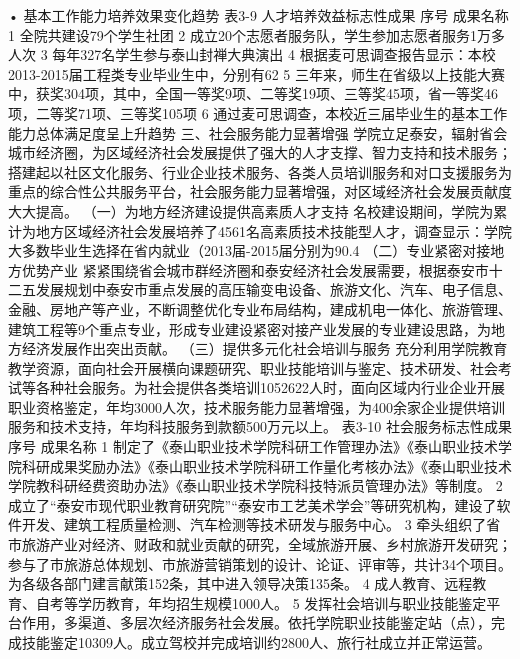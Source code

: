 	•	基本工作能力培养效果变化趋势
表3-9  人才培养效益标志性成果
序号
成果名称
1
全院共建设79个学生社团
2
成立20个志愿者服务队，学生参加志愿者服务1万多人次
3
每年327名学生参与泰山封禅大典演出
4
根据麦可思调查报告显示：本校2013-2015届工程类专业毕业生中，分别有62%
5
三年来，师生在省级以上技能大赛中，获奖304项，其中，全国一等奖9项、二等奖19项、三等奖45项，省一等奖46项，二等奖71项、三等奖105项
6
通过麦可思调查，本校近三届毕业生的基本工作能力总体满足度呈上升趋势
三、社会服务能力显著增强
学院立足泰安，辐射省会城市经济圈，为区域经济社会发展提供了强大的人才支撑、智力支持和技术服务；搭建起以社区文化服务、行业企业技术服务、各类人员培训服务和对口支援服务为重点的综合性公共服务平台，社会服务能力显著增强，对区域经济社会发展贡献度大大提高。
（一）为地方经济建设提供高素质人才支持
名校建设期间，学院为累计为地方区域经济社会发展培养了4561名高素质技术技能型人才，调查显示：学院大多数毕业生选择在省内就业（2013届-2015届分别为90.4%
（二）专业紧密对接地方优势产业
紧紧围绕省会城市群经济圈和泰安经济社会发展需要，根据泰安市十二五发展规划中泰安市重点发展的高压输变电设备、旅游文化、汽车、电子信息、金融、房地产等产业，不断调整优化专业布局结构，建成机电一体化、旅游管理、建筑工程等9个重点专业，形成专业建设紧密对接产业发展的专业建设思路，为地方经济发展作出突出贡献。
（三）提供多元化社会培训与服务
充分利用学院教育教学资源，面向社会开展横向课题研究、职业技能培训与鉴定、技术研发、社会考试等各种社会服务。为社会提供各类培训1052622人时，面向区域内行业企业开展职业资格鉴定，年均3000人次，技术服务能力显著增强，为400余家企业提供培训服务和技术支持，年均科技服务到款额500万元以上。
表3-10  社会服务标志性成果
序号
成果名称
1
制定了《泰山职业技术学院科研工作管理办法》《泰山职业技术学院科研成果奖励办法》《泰山职业技术学院科研工作量化考核办法》《泰山职业技术学院教科研经费资助办法》《泰山职业技术学院科技特派员管理办法》等制度。
2
成立了“泰安市现代职业教育研究院”“泰安市工艺美术学会”等研究机构，建设了软件开发、建筑工程质量检测、汽车检测等技术研发与服务中心。
3
牵头组织了省市旅游产业对经济、财政和就业贡献的研究，全域旅游开展、乡村旅游开发研究；参与了市旅游总体规划、市旅游营销策划的设计、论证、评审等，共计34个项目。为各级各部门建言献策152条，其中进入领导决策135条。
4
成人教育、远程教育、自考等学历教育，年均招生规模1000人。
5
发挥社会培训与职业技能鉴定平台作用，多渠道、多层次经济服务社会发展。依托学院职业技能鉴定站（点），完成技能鉴定10309人。成立驾校并完成培训约2800人、旅行社成立并正常运营。
